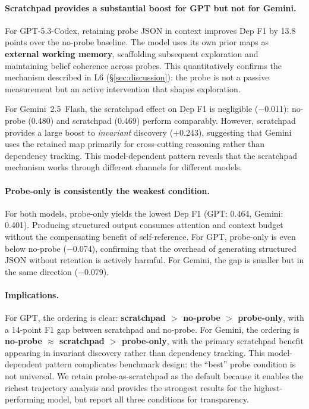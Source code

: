 \documentclass{article}
\begin{document}
\paragraph{Scratchpad provides a substantial boost for GPT but not for Gemini.}
For GPT-5.3-Codex, retaining probe JSON in context improves Dep F1 by 13.8 points over the no-probe baseline. The model uses its own prior maps as \textbf{external working memory}, scaffolding subsequent exploration and maintaining belief coherence across probes. This quantitatively confirms the mechanism described in L6 (\S\ref{sec:discussion}): the probe is not a passive measurement but an active intervention that shapes exploration.

For Gemini~2.5~Flash, the scratchpad effect on Dep F1 is negligible ($-$0.011): no-probe (0.480) and scratchpad (0.469) perform comparably. However, scratchpad provides a large boost to \emph{invariant} discovery ($+$0.243), suggesting that Gemini uses the retained map primarily for cross-cutting reasoning rather than dependency tracking. This model-dependent pattern reveals that the scratchpad mechanism works through different channels for different models.

\paragraph{Probe-only is consistently the weakest condition.}
For both models, probe-only yields the lowest Dep F1 (GPT: 0.464, Gemini: 0.401). Producing structured output consumes attention and context budget without the compensating benefit of self-reference. For GPT, probe-only is even below no-probe ($-$0.074), confirming that the overhead of generating structured JSON without retention is actively harmful. For Gemini, the gap is smaller but in the same direction ($-$0.079).

\paragraph{Implications.}
For GPT, the ordering is clear: \textbf{scratchpad $>$ no-probe $>$ probe-only}, with a 14-point F1 gap between scratchpad and no-probe. For Gemini, the ordering is \textbf{no-probe $\approx$ scratchpad $>$ probe-only}, with the primary scratchpad benefit appearing in invariant discovery rather than dependency tracking. This model-dependent pattern complicates benchmark design: the ``best'' probe condition is not universal. We retain probe-as-scratchpad as the default because it enables the richest trajectory analysis and provides the strongest results for the highest-performing model, but report all three conditions for transparency.
\end{document}
